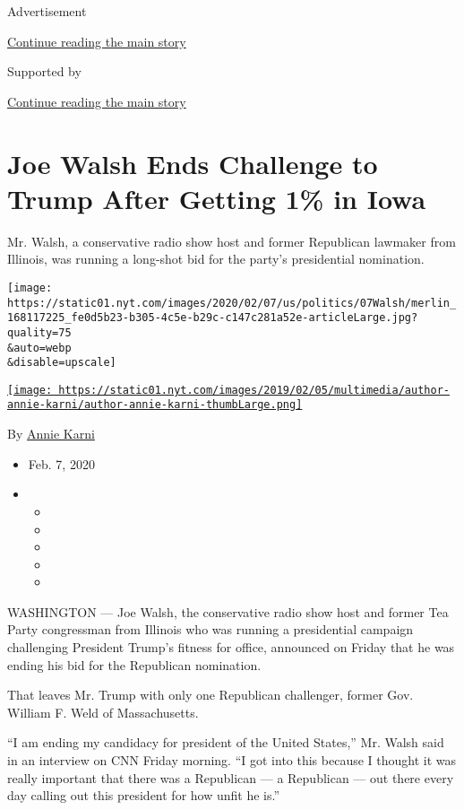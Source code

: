 Advertisement

\protect\hyperlink{after-top}{Continue reading the main story}

Supported by

\protect\hyperlink{after-sponsor}{Continue reading the main story}

\hypertarget{joe-walsh-ends-challenge-to-trump-after-getting-1-in-iowa}{%
\section{Joe Walsh Ends Challenge to Trump After Getting 1\% in
Iowa}\label{joe-walsh-ends-challenge-to-trump-after-getting-1-in-iowa}}

Mr. Walsh, a conservative radio show host and former Republican lawmaker
from Illinois, was running a long-shot bid for the party's presidential
nomination.

\texttt{[image: https://static01.nyt.com/images/2020/02/07/us/politics/07Walsh/merlin\_168117225\_fe0d5b23-b305-4c5e-b29c-c147c281a52e-articleLarge.jpg?quality=75\\\&auto=webp\\\&disable=upscale]}

\href{https://www.nytimes.com/by/annie-karni}{\texttt{[image: https://static01.nyt.com/images/2019/02/05/multimedia/author-annie-karni/author-annie-karni-thumbLarge.png]}}

By \href{https://www.nytimes.com/by/annie-karni}{Annie Karni}

\begin{itemize}
\item
  Feb. 7, 2020
\item
  \begin{itemize}
  \item
  \item
  \item
  \item
  \item
  \end{itemize}
\end{itemize}

WASHINGTON --- Joe Walsh, the conservative radio show host and former
Tea Party congressman from Illinois who was running a presidential
campaign challenging President Trump's fitness for office, announced on
Friday that he was ending his bid for the Republican nomination.

That leaves Mr. Trump with only one Republican challenger, former Gov.
William F. Weld of Massachusetts.

``I am ending my candidacy for president of the United States,'' Mr.
Walsh said in an interview on CNN Friday morning. ``I got into this
because I thought it was really important that there was a Republican
--- a Republican --- out there every day calling out this president for
how unfit he is.''

